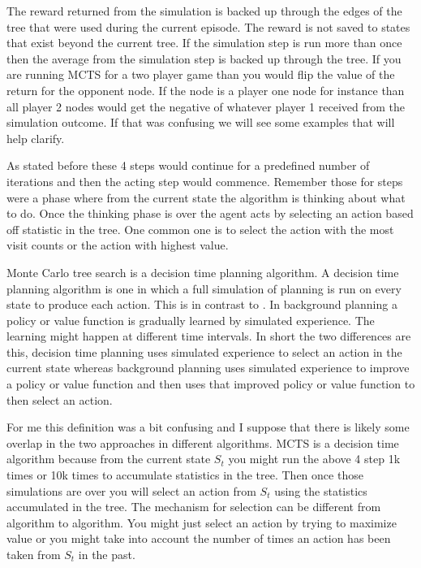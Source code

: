 \begin{search_page}
\begin{enumerate}
    The reward returned from the simulation is backed up through the edges of the tree that were used during the current episode. The reward is not saved to states that exist beyond the current tree. If the simulation step is run more than once then the average from the simulation step is backed up through the tree. If you are running MCTS for a two player game than you would flip the value of the return for the opponent node. If the node is a player one node for instance than all  player 2 nodes would get the negative of whatever player 1 received from the simulation outcome. If that was confusing we will see some examples that will help clarify. 
    
\end{enumerate}

As stated before these 4 steps would continue for a predefined number of iterations and then the acting step would commence. Remember those for steps were a  phase where from the current state the algorithm is thinking about what to do. Once the thinking phase is over the agent acts by selecting an action based off statistic in the tree. One common one is to select the action with the most visit counts or the action with highest value. 

Monte Carlo tree search is a decision time planning algorithm. A decision time planning algorithm is one in which a full simulation of planning is run on every state to produce each action. This is in contrast to . In background planning a policy or value function is gradually learned by simulated experience. The learning might happen at different time intervals. In short the two differences are this, decision time planning uses simulated experience to select an action in the current state whereas background planning uses simulated experience to improve a policy or value function and then uses that improved policy or value function to then select an action. 

For me this definition was a bit confusing and I suppose that there is likely some overlap in the two approaches in different algorithms. MCTS is a decision time algorithm because from the current state $S_t$ you might run the above 4 step 1k times or 10k times to accumulate statistics in the tree. Then once those simulations are over you will select an action from $S_t$ using the statistics accumulated in the tree. The mechanism for selection can be different from algorithm to algorithm. You might just select an action by trying to maximize value or you might take into account the number of times an action has been taken from $S_t$ in the past.


\end{search_page}
